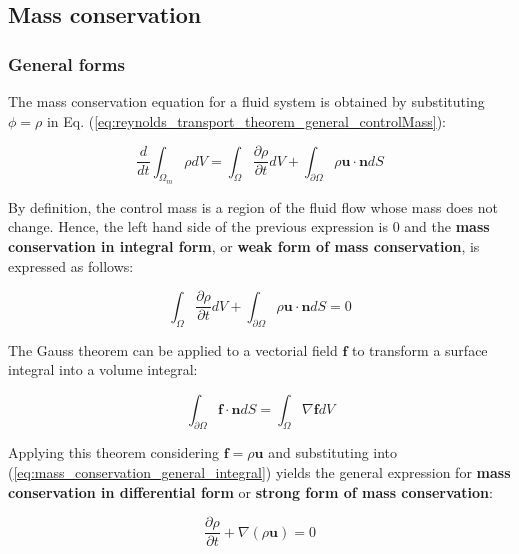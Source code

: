 \subsection{Mass conservation}

\subsubsection*{General forms}

The mass conservation equation for a fluid system is obtained by substituting $\phi = \rho$ in Eq. (\ref{eq:reynolds_transport_theorem_general_controlMass}):

\begin{equation}
\frac{d}{dt} \int_{\Omega_m} \rho  dV =  \int_\Omega \frac{\partial \rho}{\partial t} dV + \int_{\partial \Omega} \rho \boldsymbol{u} \cdot \boldsymbol{n} dS
\end{equation}

By definition, the control mass is a region of the fluid flow whose mass does not change. Hence, the left hand side of the previous expression is $0$ and the \textbf{mass conservation in integral form}, or \textbf{weak form of mass conservation}, is expressed as follows:


\begin{equation}
\label{eq:mass_conservation_general_integral}
\boxed{
\int_\Omega \frac{\partial \rho}{\partial t}   dV + \int_{\partial \Omega} \rho \boldsymbol{u} \cdot \boldsymbol{n} dS = 0
}
\end{equation}

The Gauss theorem can be applied to a vectorial field $\boldsymbol{f}$ to transform a surface integral into a volume integral:

\begin{equation}
\label{eq:gauss_theorem}
\int_{\partial \Omega} \boldsymbol{f} \cdot \boldsymbol{n} dS = \int_\Omega \nabla \boldsymbol{f}  dV
\end{equation}

Applying this theorem considering $\boldsymbol{f} = \rho \boldsymbol{u}$ and substituting into (\ref{eq:mass_conservation_general_integral}) yields the general expression for \textbf{mass conservation in differential form} or \textbf{strong form of mass conservation}:

\begin{equation}
\label{eq:mass_conservation_general_differential}
\boxed{
\frac{\partial \rho}{\partial t} + \nabla \left( \rho \boldsymbol{u} \right) = 0
}
\end{equation}

